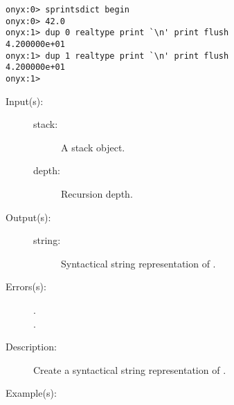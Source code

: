 \begin{description}
\begin{description}
\begin{verbatim}
onyx:0> sprintsdict begin
onyx:0> 42.0
onyx:1> dup 0 realtype print `\n' print flush
4.200000e+01
onyx:1> dup 1 realtype print `\n' print flush
4.200000e+01
onyx:1>
		\end{verbatim}
	\end{description}
\label{sprintsdict:stacktype}
\item[{\onyxop{stack depth}{stacktype}{string}}: ]
	\begin{description}\item[]
	\item[Input(s): ]
		\begin{description}\item[]
		\item[stack: ]
			A stack object.
		\item[depth: ]
			Recursion depth.
		\end{description}
	\item[Output(s): ]
		\begin{description}\item[]
		\item[string: ]
			Syntactical string representation of .
		\end{description}
	\item[Errors(s): ]
		\begin{description}\item[]
		\item[.]
		\item[.]
		\end{description}
	\item[Description: ]
		Create a syntactical string representation of .
	\item[Example(s): ]\begin{verbatim}


\end{verbatim}
\end{description}
\end{description}
